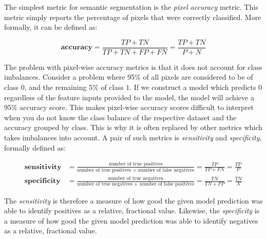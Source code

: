 The simplest metric for semantic segmentation is the \textit{pixel accuracy} metric.
This metric simply reports the percentage of pixels that were correctly classified.
More formally, it can be defined as:

\begin{equation*}
    \textbf{accuracy} = \frac{TP + TN}{TP + TN + FP + FN} = \frac{TP + TN}{P + N}
\end{equation*}

The problem with pixel-wise accuracy metrics is that it does not account for class imbalances.
Consider a problem where 95\% of all pixels are considered to be of class $0$, and the remaining 5\% of class $1$.
If we construct a model which predicts $0$ regardless of the feature inputs provided to the model, the model will achieve a 95\% accuracy score.
This makes pixel-wise accuracy scores difficult to interpret when you do not know the class balance of the respective dataset and the accuracy grouped by class.
This is why it is often replaced by other metrics which takes imbalances into account.
A pair of such metrics is \textit{sensitivity} and \textit{specificity}, formally defined as:

\begin{align*}
    \textbf{sensitivity}
    &=
    \frac{\text{number of true positives}}{\text{number of true positives + number of false negatives}}
    =
    \frac{TP}{TP + FN}
    =
    \frac{TP}{P}
    \\
    \textbf{specificity}
    &=
    \frac{\text{number of true negatives}}{\text{number of true negatives + number of false positives}}
    =
    \frac{TN}{TN + FP}
    =
    \frac{TN}{N}
\end{align*}

The \textit{sensitivity} is therefore a measure of how good the given model prediction was able to identify positives as a relative, fractional value.
Likewise, the \textit{specificity} is a measure of how good the given model prediction was able to identify negatives as a relative, fractional value.
